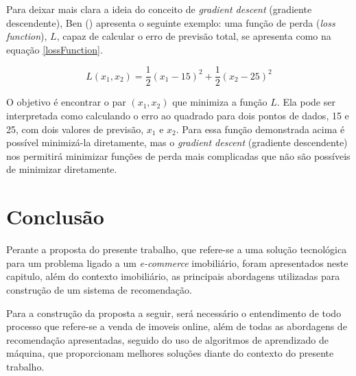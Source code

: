 Para deixar mais clara a ideia do conceito de \textit{gradient descent} (gradiente descendente), Ben (\citeyear{Ben:2017}) apresenta o seguinte exemplo: uma função de perda (\textit{loss function}), \(L\), capaz de calcular o erro de previsão total, se apresenta como na equação \eqref{lossFunction}.
 
 \begin{equation}\label{lossFunction}L(x_1, x_2)=\frac{1}{2}(x_1-15)^2+\frac{1}{2}(x_2-25)^2\end{equation}

O objetivo é encontrar o par \((x_1, x_2)\) que minimiza a função \(L\). Ela pode ser interpretada como calculando o erro ao quadrado para dois pontos de dados, 15 e 25, com dois valores de previsão, \(x_1\) e \(x_2\). Para essa função demonstrada acima é possível minimizá-la diretamente, mas o \textit{gradient descent} (gradiente descendente) nos permitirá minimizar funções de perda mais complicadas que não são possíveis de minimizar diretamente.

\section{Conclusão}

Perante a proposta do presente trabalho, que refere-se a uma solução tecnológica para um problema ligado a um \textit{e-commerce} imobiliário, foram apresentados neste capitulo, além do contexto imobiliário, as principais abordagens utilizadas para construção de um sistema de recomendação.

Para a construção da proposta a seguir, será necessário o entendimento de todo processo que refere-se a venda de imoveis online, além de todas as abordagens de recomendação apresentadas, seguido do uso de algoritmos de aprendizado de máquina, que proporcionam melhores soluções diante do contexto do presente trabalho.